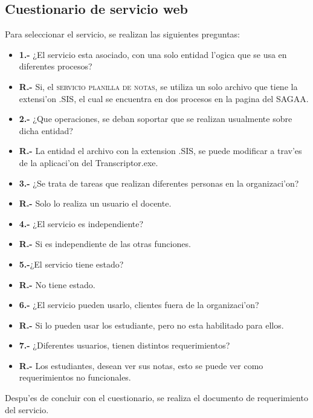 \subsection{Cuestionario de servicio web}
Para seleccionar el servicio, se realizan las siguientes preguntas: 
\begin{itemize}

\item \textbf{1.-} ¿El servicio esta asociado, con una solo entidad l'ogica que se usa en diferentes procesos?
\item \textbf{R.-} Si, el \textsc{servicio planilla de notas}, se utiliza un solo archivo que tiene la extensi'on \textsc{.SIS}, el cual se encuentra en dos procesos en la pagina del SAGAA.
 
\item \textbf{2.-} ¿Que operaciones, se deban soportar que se realizan usualmente sobre dicha entidad?
\item \textbf{R.-} La entidad el archivo con la extension \textsc{.SIS}, se puede modificar a trav'es de la aplicaci'on del Transcriptor.exe.

\item \textbf{3.-} ¿Se trata de tareas que realizan diferentes personas en la organizaci'on?
\item \textbf{R.-} Solo lo realiza un usuario el docente.

\item \textbf{4.-} ¿El servicio es independiente?
\item \textbf{R.-} Si es independiente de las otras funciones. 

\item \textbf{5.-}¿El servicio tiene estado?
\item \textbf{R.-} No tiene estado.

\item \textbf{6.-} ¿El servicio pueden usarlo, clientes fuera de la organizaci'on?
\item \textbf{R.-} Si lo pueden usar los estudiante, pero no esta habilitado para ellos.

\item \textbf{7.-} ¿Diferentes usuarios, tienen distintos requerimientos?
\item \textbf{R.-} Los estudiantes, desean ver sus notas, esto se puede ver como requerimientos no funcionales.
\end{itemize}

Despu'es de concluir con el cuestionario, se realiza el documento de requerimiento del servicio.

